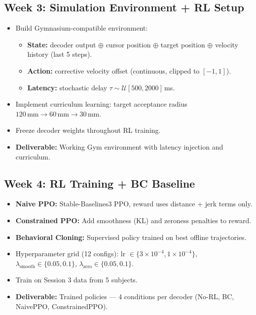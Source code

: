 \documentclass[11pt]{article}
\begin{document}
\subsection*{Week 3: Simulation Environment + RL Setup}
\begin{itemize}[leftmargin=*,nosep]
    \item Build Gymnasium-compatible environment:
    \begin{itemize}[nosep]
        \item \textbf{State:} decoder output $\oplus$ cursor position $\oplus$ target position $\oplus$ velocity history (last 5 steps).
        \item \textbf{Action:} corrective velocity offset (continuous, clipped to $[-1,1]$).
        \item \textbf{Latency:} stochastic delay $\tau \sim \mathcal{U}[500, 2000]$\,ms.
    \end{itemize}
    \item Implement curriculum learning: target acceptance radius $120\,\text{mm} \to 60\,\text{mm} \to 30\,\text{mm}$.
    \item Freeze decoder weights throughout RL training.
    \item \textbf{Deliverable:} Working Gym environment with latency injection and curriculum.
\end{itemize}

\subsection*{Week 4: RL Training + BC Baseline}
\begin{itemize}[leftmargin=*,nosep]
    \item \textbf{Naive PPO:} Stable-Baselines3 PPO, reward uses distance + jerk terms only.
    \item \textbf{Constrained PPO:} Add smoothness (KL) and zeroness penalties to reward.
    \item \textbf{Behavioral Cloning:} Supervised policy trained on best offline trajectories.
    \item Hyperparameter grid (12 configs): lr $\in\{3\!\times\!10^{-4}, 1\!\times\!10^{-4}\}$, $\lambda_{\text{smooth}}\in\{0.05, 0.1\}$, $\lambda_{\text{zero}}\in\{0.05, 0.1\}$.
    \item Train on Session 3 data from 5 subjects.
    \item \textbf{Deliverable:} Trained policies --- 4 conditions per decoder (No-RL, BC, NaivePPO, ConstrainedPPO).
\end{itemize}
\end{document}

